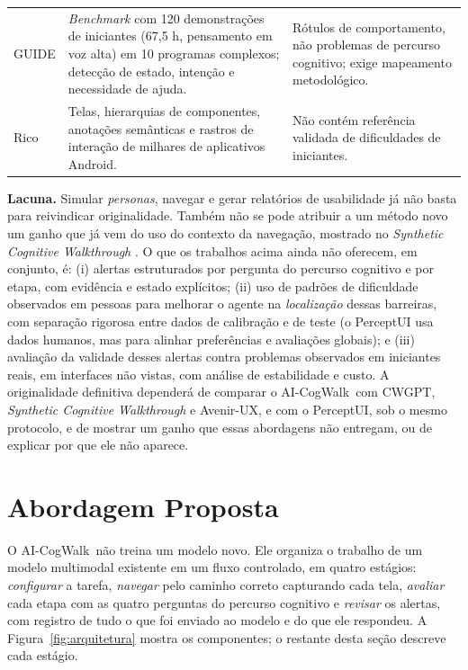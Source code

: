 \documentclass[12pt]{article}
\newcommand{\proj}{AI-CogWalk}
\begin{document}
\begin{table}[!ht]
\begin{tabularx}{\linewidth}{@{}>{\raggedright\arraybackslash}p{2.6cm} Y Y@{}}
\addlinespace
GUIDE \cite{yang2026guide} & \textit{Benchmark} com 120 demonstrações de iniciantes (67,5 h, pensamento em voz alta) em 10 programas complexos; detecção de estado, intenção e necessidade de ajuda. & Rótulos de comportamento, não problemas de percurso cognitivo; exige mapeamento metodológico. \\
\addlinespace
Rico \cite{deka2017rico} & Telas, hierarquias de componentes, anotações semânticas e rastros de interação de milhares de aplicativos Android. & Não contém referência validada de dificuldades de iniciantes. \\
\bottomrule
\end{tabularx}
\end{table}

\textbf{Lacuna.} Simular \textit{personas}, navegar e gerar relatórios de usabilidade já não basta para reivindicar originalidade. Também não se pode atribuir a um método novo um ganho que já vem do uso do contexto da navegação, mostrado no \textit{Synthetic Cognitive Walkthrough} \cite{zhong2025syntheticcw}. O que os trabalhos acima ainda não oferecem, em conjunto, é: (i) alertas estruturados por pergunta do percurso cognitivo e por etapa, com evidência e estado explícitos; (ii) uso de padrões de dificuldade observados em pessoas para melhorar o agente na \textit{localização} dessas barreiras, com separação rigorosa entre dados de calibração e de teste (o PerceptUI usa dados humanos, mas para alinhar preferências e avaliações globais); e (iii) avaliação da validade desses alertas contra problemas observados em iniciantes reais, em interfaces não vistas, com análise de estabilidade e custo. A originalidade definitiva dependerá de comparar o \proj\ com CWGPT, \textit{Synthetic Cognitive Walkthrough} e Avenir-UX, e com o PerceptUI, sob o mesmo protocolo, e de mostrar um ganho que essas abordagens não entregam, ou de explicar por que ele não aparece.

\section{Abordagem Proposta}
\label{sec:abordagem}

O \proj\ não treina um modelo novo. Ele organiza o trabalho de um modelo multimodal existente em um fluxo controlado, em quatro estágios: \textit{configurar} a tarefa, \textit{navegar} pelo caminho correto capturando cada tela, \textit{avaliar} cada etapa com as quatro perguntas do percurso cognitivo e \textit{revisar} os alertas, com registro de tudo o que foi enviado ao modelo e do que ele respondeu. A Figura~\ref{fig:arquitetura} mostra os componentes; o restante desta seção descreve cada estágio.
\end{document}
